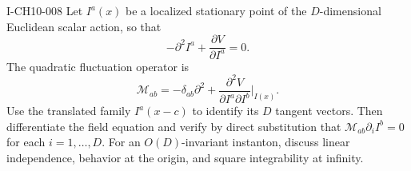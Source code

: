 \begin{exercise}{I-CH10-008}
Let $I^a(x)$ be a localized stationary point of the $D$-dimensional Euclidean
scalar action, so that
\[
  -\partial^2 I^a+\frac{\partial V}{\partial I^a}=0.
\]
The quadratic fluctuation operator is
\[
  \mathcal M_{ab}=-\delta_{ab}\partial^2
  +\frac{\partial^2V}{\partial I^a\partial I^b}\bigg|_{I(x)}.
\]
Use the translated family $I^a(x-c)$ to identify its $D$ tangent vectors.
Then differentiate the field equation and verify by direct substitution that
$\mathcal M_{ab}\partial_iI^b=0$ for each $i=1,\ldots,D$.  For an
$O(D)$-invariant instanton, discuss linear independence, behavior at the
origin, and square integrability at infinity.
\end{exercise}

